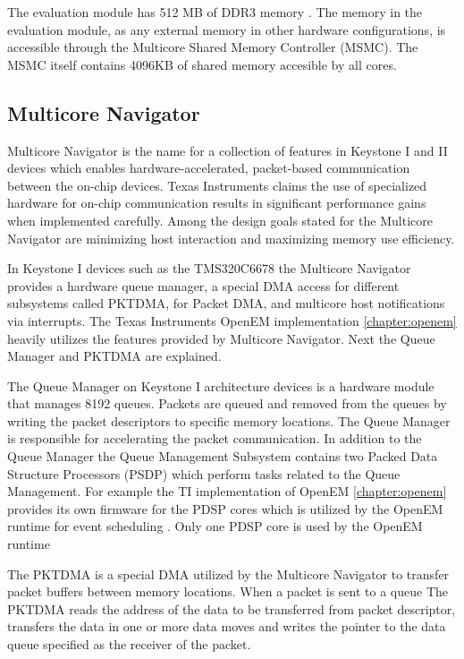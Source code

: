 The evaluation module has 512 MB of DDR3 memory \cite{evmref}. The memory in the
evaluation module, as any external memory in other hardware configurations, is
accessible through the Multicore Shared Memory Controller (MSMC). The MSMC
itself contains 4096KB of shared memory accesible by all cores.

\subsection{Multicore Navigator}
\label{subsec:multicorenav}
Multicore Navigator is the name for a collection of features in Keystone I and
II devices which enables hardware-accelerated, packet-based communication
between the on-chip devices. Texas Instruments claims the use of specialized
hardware for on-chip communication results in significant performance gains when
implemented carefully. Among the design goals stated for the Multicore Navigator
are minimizing host interaction and maximizing memory use efficiency.
\cite{navigator}

In Keystone I devices such as the TMS320C6678 the Multicore Navigator provides a
hardware queue manager, a special DMA access for different subsystems called
PKTDMA, for Packet DMA, and multicore host notifications via interrupts.
\cite{navigator} The Texas Instruments OpenEM implementation
\ref{chapter:openem} heavily utilizes the features provided by Multicore
Navigator. Next the Queue Manager and PKTDMA are explained.

The Queue Manager on Keystone I architecture devices is a hardware module that
manages 8192 queues. Packets are queued and removed from the queues by writing
the packet descriptors to specific memory locations. The Queue Manager is
responsible for accelerating the packet communication. In addition to the Queue
Manager the Queue Management Subsystem contains two Packed Data Structure
Processors (PSDP) which perform tasks related to the Queue Management.
\cite{navigator} For example the TI implementation of OpenEM
\ref{chapter:openem} provides its own firmware for the PDSP cores which is
utilized by the OpenEM runtime for event scheduling \cite{openemwhite}. Only one
PDSP core is used by the OpenEM runtime

The PKTDMA is a special DMA utilized by the Multicore Navigator to transfer
packet buffers between memory locations. When a packet is sent to a queue The
PKTDMA reads the address of the data to be transferred from packet descriptor,
transfers the data in one or more data moves and writes the pointer to the data
queue specified as the receiver of the packet. \cite{navigator}

